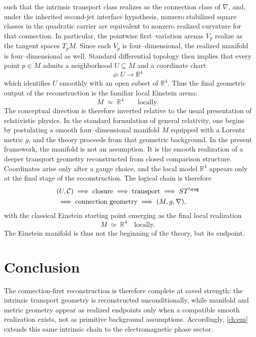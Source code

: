such that the intrinsic transport class realizes as the connection
class of \(\nabla\), and, under the inherited second-jet interface
hypothesis, nonzero stabilized square classes in the quadratic carrier
are equivalent to nonzero realized curvature for that connection.
In particular, the pointwise first--variation arenas \(V_p\) realize as
the tangent spaces \(T_pM\).  Since each \(V_p\) is four--dimensional,
the realized manifold is four--dimensional as well.
\medskip
Standard differential topology then implies that every point
\(p\in M\) admits a neighborhood \(U\subseteq M\) and a coordinate
chart
\[
	\phi:U\to\mathbb{R}^4
\]
which identifies \(U\) smoothly with an open subset of \(\mathbb{R}^4\).
Thus the final geometric output of the reconstruction is the familiar
local Einstein arena:
\[
	M \;\simeq\; \mathbb{R}^4
	\qquad \text{locally}.
\]
\medskip
The conceptual direction is therefore inverted relative to the usual
presentation of relativistic physics.
In the standard formulation of general relativity, one begins by
postulating a smooth four--dimensional manifold \(M\) equipped with a
Lorentz metric \(g\), and the theory proceeds from that geometric
background.
In the present framework, the manifold is not an assumption.  It is the
smooth realization of a deeper transport geometry reconstructed from
closed comparison structure.  Coordinates arise only after a gauge
choice, and the local model \(\mathbb{R}^4\) appears only at the final
stage of the reconstruction.
\medskip
The logical chain is therefore
\[
	\begin{aligned}
		 & (U,\mathcal C)
		\;\Longrightarrow\;
		\text{closure}
		\;\Longrightarrow\;
		\text{transport}
		\;\Longrightarrow\;
		ST^{\reg}
		\\
		 & \;\Longrightarrow\;
		\text{connection geometry}
		\;\Longrightarrow\;
		(M,g,\nabla),
	\end{aligned}
\]
with the classical Einstein starting point emerging as the final local
realization
\[
	M \;\simeq\; \mathbb{R}^4
	\quad \text{locally}.
\]
The Einstein manifold is thus not the beginning of the theory, but its
endpoint.

\section{Conclusion}
\label{sec:connection-transition}
The connection-first reconstruction is therefore complete at saved
strength: the intrinsic transport geometry is reconstructed
unconditionally, while manifold and metric geometry appear as realized
endpoints only when a compatible smooth realization exists, not as
primitive background assumptions.
Accordingly, \cref{ch:em} extends this same intrinsic chain to the electromagnetic
phase sector.